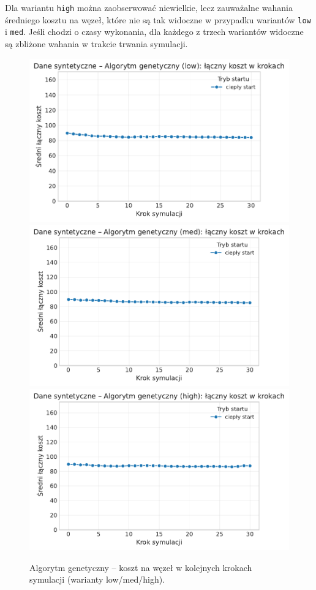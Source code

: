 Dla wariantu \texttt{high} można zaobserwować niewielkie, lecz zauważalne wahania średniego kosztu na węzeł, które nie są tak widoczne w przypadku wariantów \texttt{low} i \texttt{med}. Jeśli chodzi o czasy wykonania, dla każdego z trzech wariantów widoczne są zbliżone wahania w trakcie trwania symulacji.

\begin{figure}[H]
  \centering
  \includegraphics[width=0.32\linewidth]{assets/figures/dynamic/synthetic/synthetic_algorytm_genetyczny_cost_over_steps_low.pdf}
  \includegraphics[width=0.32\linewidth]{assets/figures/dynamic/synthetic/synthetic_algorytm_genetyczny_cost_over_steps_med.pdf}
  \includegraphics[width=0.32\linewidth]{assets/figures/dynamic/synthetic/synthetic_algorytm_genetyczny_cost_over_steps_high.pdf}
  \caption{Algorytm genetyczny -- koszt na węzeł w kolejnych krokach symulacji (warianty low/med/high).}
  \label{fig:dyn-synth-genetic-cost}
\end{figure}

